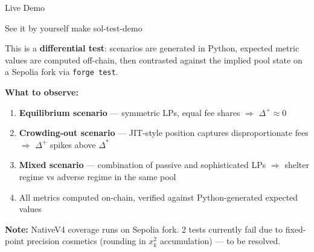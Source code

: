 \documentclass[aspectratio=169]{beamer}
\newcommand{\DeltaPlus}{\Delta^{+}}
\newcommand{\DeltaStar}{\Delta^{*}}
\begin{document}
\begin{frame}[fragile]{Live Demo}

\begin{block}{See it by yourself}
\ttfamily\small
make sol-test-demo
\end{block}

\medskip

This is a \textbf{differential test}: scenarios are generated in Python, expected
metric values are computed off-chain, then contrasted against the implied pool
state on a Sepolia fork via \texttt{forge test}.

\medskip

\textbf{What to observe:}
\begin{enumerate}\small
  \item \textbf{Equilibrium scenario} --- symmetric LPs, equal fee shares
    $\Rightarrow$ $\DeltaPlus \approx 0$
  \item \textbf{Crowding-out scenario} --- JIT-style position captures
    disproportionate fees $\Rightarrow$ $\DeltaPlus$ spikes above $\DeltaStar$
  \item \textbf{Mixed scenario} --- combination of passive and sophisticated LPs
    $\Rightarrow$ shelter regime vs adverse regime in the same pool
  \item All metrics computed on-chain, verified against Python-generated
    expected values
\end{enumerate}

\medskip

{\footnotesize
\textbf{Note:} NativeV4 coverage runs on Sepolia fork. 2 tests currently fail
due to fixed-point precision cosmetics (rounding in $x_k^2$ accumulation) ---
to be resolved.}

\end{frame}
\end{document}
